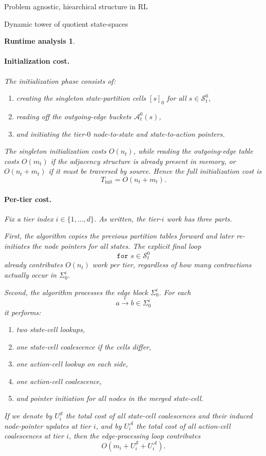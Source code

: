 \documentclass[11pt]{article}
\newtheorem{run_analysis}[subsubsection]{Runtime analysis}
\begin{document}
\begin{section}{Problem agnostic, hiearchical structure in RL}
\begin{subsection}{Dynamic tower of quotient state-spaces}
\begin{run_analysis}
\paragraph{Initialization cost.}
The initialization phase consists of:
\begin{enumerate}
    \item creating the singleton state-partition cells $[s]_0$ for all $s\in\mathcal{S}_t^0$,
    \item reading off the outgoing-edge buckets $\mathcal{A}_t^0(s)$,
    \item and initiating the tier-$0$ node-to-state and state-to-action pointers.
\end{enumerate}
The singleton initialization costs $O(n_t)$, while reading the outgoing-edge table costs $O(m_t)$ if the adjacency structure is already present in memory, or $O(n_t+m_t)$ if it must be traversed by source. Hence the full initialization cost is
\[
T_{\mathrm{init}}=O(n_t+m_t).
\]

\paragraph{Per-tier cost.}
Fix a tier index $i\in\{1,\dots,d\}$. As written, the tier-$i$ work has three parts.

First, the algorithm copies the previous partition tables forward and later re-initiates the node pointers for all states. The explicit final loop
\[
\texttt{for }s\in\mathcal{S}_t^0
\]
already contributes $O(n_t)$ work per tier, regardless of how many contractions actually occur in $\Sigma_0^i$.

Second, the algorithm processes the edge block $\Sigma_0^i$. For each
\[
a\xrightarrow{\ e\ }b\in\Sigma_0^i
\]
it performs:
\begin{enumerate}
    \item two state-cell lookups,
    \item one state-cell coalescence if the cells differ,
    \item one action-cell lookup on each side,
    \item one action-cell coalescence,
    \item and pointer initiation for all nodes in the merged state-cell.
\end{enumerate}
If we denote by
$
U_i^{\mathcal S}
$
the total cost of all state-cell coalescences and their induced node-pointer updates at tier $i$, and by
$
U_i^{\mathcal A}
$
the total cost of all action-cell coalescences at tier $i$, then the edge-processing loop contributes
\[
O(m_i + U_i^{\mathcal S}+U_i^{\mathcal A}).
\]


\end{run_analysis}
\end{subsection}
\end{section}
\end{document}

